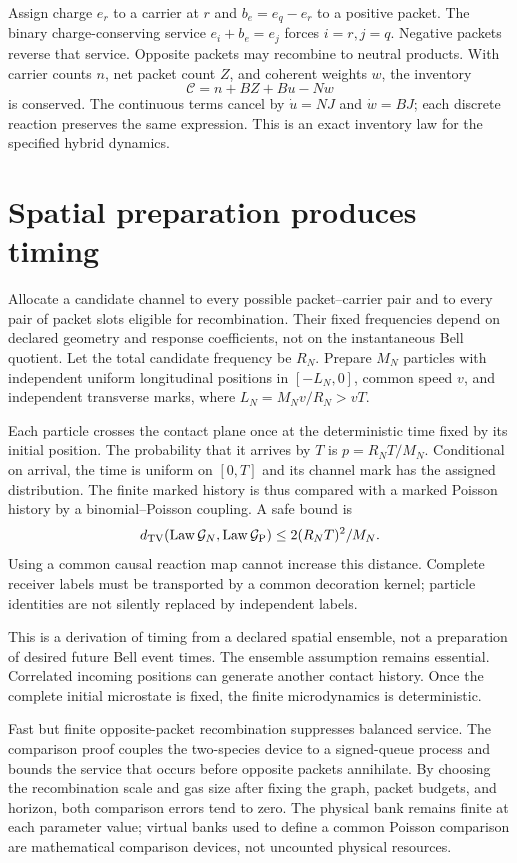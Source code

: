 Assign charge $e_r$ to a carrier at $r$ and $b_e=e_q-e_r$ to a positive packet. The binary charge-conserving service $e_i+b_e=e_j$ forces $i=r,j=q$. Negative packets reverse that service. Opposite packets may recombine to neutral products. With carrier counts $n$, net packet count $Z$, and coherent weights $w$, the inventory
\[
\mathcal C=n+BZ+Bu-Nw
\]
is conserved. The continuous terms cancel by $\dot u=NJ$ and $\dot w=BJ$; each discrete reaction preserves the same expression. This is an exact inventory law for the specified hybrid dynamics.

\section{Spatial preparation produces timing}\label{section:pilot:spatial-preparation-produces-timing}
Allocate a candidate channel to every possible packet--carrier pair and to every pair of packet slots eligible for recombination. Their fixed frequencies depend on declared geometry and response coefficients, not on the instantaneous Bell quotient. Let the total candidate frequency be $R_N$. Prepare $M_N$ particles with independent uniform longitudinal positions in $[-L_N,0]$, common speed $v$, and independent transverse marks, where $L_N=M_Nv/R_N>vT$.

Each particle crosses the contact plane once at the deterministic time fixed by its initial position. The probability that it arrives by $T$ is $p=R_NT/M_N$. Conditional on arrival, the time is uniform on $[0,T]$ and its channel mark has the assigned distribution. The finite marked history is thus compared with a marked Poisson history by a binomial--Poisson coupling. A safe bound is
\begin{equation}\label{eq:gasbound}
d_{\mathrm{TV}}(\operatorname{Law}\mathcal G_N,\operatorname{Law}\mathcal G_{\mathrm P})
\le 2(R_NT)^2/M_N.
\end{equation}
Using a common causal reaction map cannot increase this distance. Complete receiver labels must be transported by a common decoration kernel; particle identities are not silently replaced by independent labels.

This is a derivation of timing from a declared spatial ensemble, not a preparation of desired future Bell event times. The ensemble assumption remains essential. Correlated incoming positions can generate another contact history. Once the complete initial microstate is fixed, the finite microdynamics is deterministic.

Fast but finite opposite-packet recombination suppresses balanced service. The comparison proof couples the two-species device to a signed-queue process and bounds the service that occurs before opposite packets annihilate. By choosing the recombination scale and gas size after fixing the graph, packet budgets, and horizon, both comparison errors tend to zero. The physical bank remains finite at each parameter value; virtual banks used to define a common Poisson comparison are mathematical comparison devices, not uncounted physical resources.

